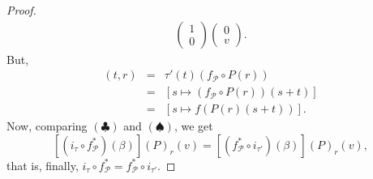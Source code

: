 \documentclass[11pt,reqno]{amsart}
\theoremstyle{definition}
\def \P{{P}}
\newcommand{\cP}{{\mathcal P}}
\def \fPaths#1{#1_{\cP}}
\begin{document}
\begin{proof}
\begin{eqnarray*}[(\fPaths{f}^* \circ
      i_{\tau'})(\beta)]
      \begin{pmatrix}1 \\ 0\end{pmatrix} \begin{pmatrix}0 \\ v\end{pmatrix}.
    \end{eqnarray*}
    But,
    \renewcommand{\theequation}{$\spadesuit$}
    \begin{eqnarray}
      [\tau'\cdot(\fPaths{f} \circ \P)](t,r) & = & \tau'(t)(\fPaths{f} \circ \P(r))\nonumber \\
      & = & [s \mapsto (\fPaths{f} \circ \P(r))(s+t)]\nonumber \\
      & = & [s \mapsto f(\P(r)(s+t))]. 
    \end{eqnarray} 
      Now, comparing $(\clubsuit)$ and $(\spadesuit)$, we get
    $$
    [(i_{\tau} \circ \fPaths{f}^*)(\beta)](\P)_r(v) = [(\fPaths{f}^*
      \circ i_{\tau'})(\beta)](\P)_r(v),
      $$
    that is, finally, $i_{\tau} \circ \fPaths{f}^* = \fPaths{f}^*
      \circ i_{\tau'}$.
  \end{proof}
  
\end{document}
